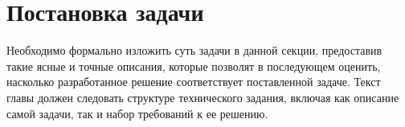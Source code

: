 \section{Постановка задачи}
\label{sec:Chapter1} 

Необходимо формально изложить суть задачи в данной секции, предоставив такие
ясные и точные описания, которые позволят в последующем оценить, насколько
разработанное решение соответствует поставленной задаче. Текст главы должен
следовать структуре технического задания, включая как описание самой задачи,
так и набор требований к ее решению.